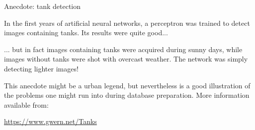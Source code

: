\documentclass[xcolor=pdftex,dvipsnames,table,mathserif]{beamer}
\begin{document}
\begin{frame}{Anecdote: tank detection}

  In the first years of artificial neural networks, a perceptron was trained to detect images containing tanks. Its results were quite good...
  \vspace{1em}

  \pause

  ... but in fact images containing tanks were acquired during sunny days, while images without tanks were shot with overcast weather. The network was simply detecting lighter images!
  \vspace{1em}

  \pause

  This anecdote might be a urban legend, but nevertheless is a good illustration of the problems one might run into during database preparation. More information available from:

  \centering
  \url{https://www.gwern.net/Tanks}
\end{frame}


\end{document}
